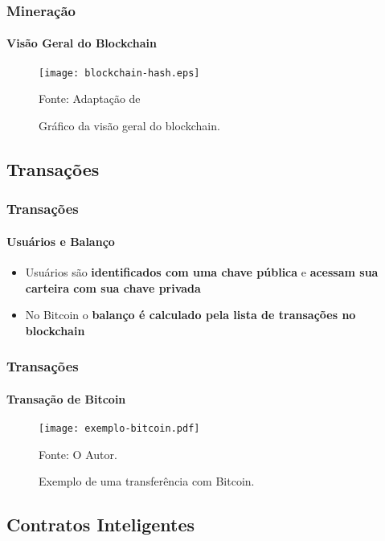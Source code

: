 \documentclass[aspectratio=43]{beamer}
\begin{document}
\begin{frame}
    \frametitle{Mineração}
    \framesubtitle{Visão Geral do Blockchain}
    
    \begin{figure}[H]
        \caption{\label{fig:blockchain-hash}Gráfico da visão geral
        do blockchain.}
        \begin{center}
            \texttt{[image: blockchain-hash.eps]}
        \end{center}
        Fonte: Adaptação de \cite{Nakamoto2008}
    \end{figure}
\end{frame}

\subsection{Transações}

\begin{frame}
    \frametitle{Transações}
    \framesubtitle{Usuários e Balanço}
    
    \begin{itemize}
        \item Usuários são \textbf{identificados com uma chave
            pública} e
            \textbf{acessam sua carteira com sua chave privada}

        \item No Bitcoin o \textbf{balanço é calculado pela lista de
            transações no blockchain}

    \end{itemize}
\end{frame}

\begin{frame}
    \frametitle{Transações}
    \framesubtitle{Transação de Bitcoin}
    
    \begin{figure}[H]
        \caption{\label{fig:exemplo-bitcoin}Exemplo de uma transferência
            com Bitcoin.}
        \begin{center}
            \texttt{[image: exemplo-bitcoin.pdf]}
        \end{center}
        Fonte: O Autor.
    \end{figure}
\end{frame}

\subsection{Contratos Inteligentes}
\end{document}
